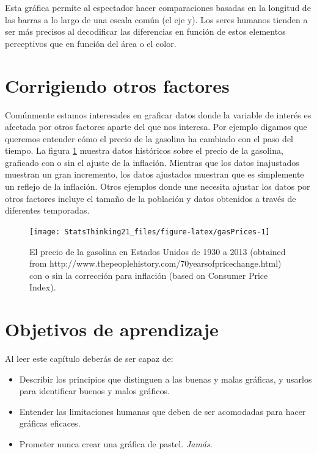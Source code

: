 \documentclass[
  12pt,
]{book}
\providecommand{\tightlist}{%
  \setlength{\itemsep}{0pt}\setlength{\parskip}{0pt}}
\begin{document}
Esta gráfica permite al espectador hacer comparaciones basadas en la longitud de las barras a lo largo de una escala común (el eje y). Los seres humanos tienden a ser más precisos al decodificar las diferencias en función de estos elementos perceptivos que en función del área o el color.

\hypertarget{corrigiendo-otros-factores}{%
\section{Corrigiendo otros factores}\label{corrigiendo-otros-factores}}

Comúnmente estamos interesades en graficar datos donde la variable de interés es afectada por otros factores aparte del que nos interesa. Por ejemplo digamos que queremos entender cómo el precio de la gasolina ha cambiado con el paso del tiempo. La figura \ref{fig:gasPrices} muestra datos históricos sobre el precio de la gasolina, graficado con o sin el ajuste de la inflación. Mientras que los datos inajustados muestran un gran incremento, los datos ajustados muestran que es simplemente un reflejo de la inflación. Otros ejemplos donde une necesita ajustar los datos por otros factores incluye el tamaño de la población y datos obtenidos a través de diferentes temporadas.

\begin{figure}
\texttt{[image: StatsThinking21\_files/figure-latex/gasPrices-1]} \caption{El precio de la gasolina en Estados Unidos de 1930 a 2013 (obtained from http://www.thepeoplehistory.com/70yearsofpricechange.html) con o sin la corrección para inflación (based on Consumer Price Index).}\label{fig:gasPrices}
\end{figure}

\hypertarget{objetivos-de-aprendizaje-3}{%
\section{Objetivos de aprendizaje}\label{objetivos-de-aprendizaje-3}}

Al leer este capítulo deberás de ser capaz de:

\begin{itemize}
\tightlist
\item
  Describir los principios que distinguen a las buenas y malas gráficas, y usarlos para identificar buenos y malos gráficos.
\item
  Entender las limitaciones humanas que deben de ser acomodadas para hacer gráficas eficaces.
\item
  Prometer nunca crear una gráfica de pastel. \emph{Jamás}.
\end{itemize}
\end{document}

